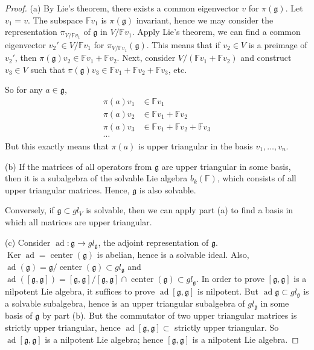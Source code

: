 \documentclass[10pt,twoside]{article}
\newcommand{\Ff}{\mathbb F}
\newcommand{\mg}{\mathfrak{g}}
\theoremstyle{definition}
\theoremstyle{remark}
\begin{document}
\begin{proof}
\noindent
(a)  By Lie's theorem, there exists a common eigenvector $v$ for $\pi(\mg)$.  Let $v_1=v$.  The subspace $\Ff v_1$ is $\pi(\mg)$ invariant, hence we may consider the representation $\pi_{V/\Ff v_1}$ of $\mg$ in $V/\Ff v_1$.  Apply Lie's theorem, we can find a common eigenvector $v_2' \in V/\Ff v_1$ for $\pi_{V/\Ff v_1}(\mg)$.  This means that if $v_2 \in V$ is a preimage of $v_2'$, then $\pi(\mg)v_2 \in \Ff v_1 + \Ff v_2$.  Next, consider $V/(\Ff v_1 + \Ff v_2)$ and construct $v_3 \in V$ such that $\pi(\mg)v_3 \in \Ff v_1+ \Ff v_2+ \Ff v_3$, etc.

So for any $a \in \mg$, \begin{align*} 
\pi(a)v_1 & \in \Ff v_1 \\
\pi(a)v_2 & \in \Ff v_1 + \Ff v_2 \\
\pi(a)v_3 & \in \Ff v_1 + \Ff v_2 + \Ff v_3\\
\cdots
\end{align*}
But this exactly means that $\pi(a)$ is upper triangular in the basis $v_1, \dotsc, v_n$.  

\medskip 
\noindent
(b) If the matrices of all operators from $\mg$ are upper triangular in some basis, then it is a subalgebra of the solvable Lie algebra $b_k(\Ff)$, which consists of all upper triangular matrices.  Hence, $\mg$ is also solvable.

Conversely, if $\mg \subset gl_V$ is solvable, then we can apply part (a) to find a basis in which all matrices are upper triangular.

\medskip
\noindent
(c)  Consider $\operatorname{ad}:\mg \rightarrow gl_\mg$, the adjoint representation of $\mg$.  $\operatorname{Ker} \operatorname{ad}=\operatorname{center}(\mg)$ is abelian, hence is a solvable ideal.  Also, $\operatorname{ad}(\mg)=\mg/\operatorname{center}(\mg) \subset gl_\mg$ and $\operatorname{ad}([\mg,\mg])=[\mg,\mg]/[\mg,\mg]\cap \operatorname{center}(\mg) \subset gl_\mg$.  In order to prove $[\mg, \mg]$ is a nilpotent Lie algebra, it suffices to prove $\operatorname{ad}[\mg, \mg]$ is nilpotent.  But $\operatorname{ad}\mg \subset gl_\mg$ is a solvable subalgebra, hence is an upper triangular subalgebra of $gl_\mg$ in some basis of $\mg$ by part (b).  But the commutator of two upper triangular matrices is strictly upper triangular, hence $\operatorname{ad}[\mg,\mg] \subset$ strictly upper triangular.  So $\operatorname{ad}[\mg,\mg]$ is a nilpotent Lie algebra; hence $[\mg,\mg]$ is a nilpotent Lie algebra.  

\end{proof}
\end{document}
